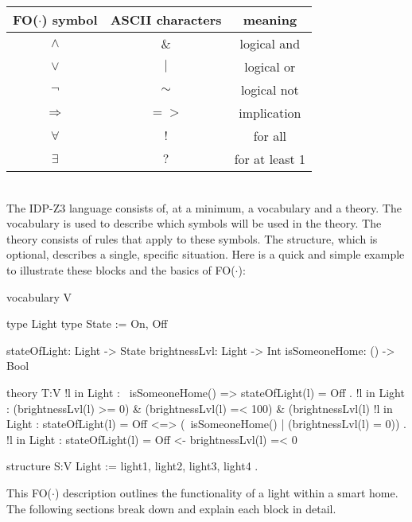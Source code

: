 \documentclass[11pt,a4paper]{report}
\newcommand{\fodot}{FO($\cdot$)\xspace}
\begin{document}
\begin{tabular}{|c|c|c|}
\hline
\fodot symbol & ASCII characters & meaning \\ \hline
$\land$  & $\&$ & logical and   \\ \hline
$\lor$   & $\mid$ & logical or   \\ \hline
$\neg$   & $\sim$ & logical not   \\ \hline
$\Rightarrow$ & $=>$ & implication   \\ \hline
$\forall$ & $!$ & for all   \\ \hline
$\exists$   & $?$ & for at least 1   \\ \hline
\end{tabular}
\\

The IDP-Z3 language consists of, at a minimum, a vocabulary and a theory. The vocabulary is used to describe which symbols will be used in the theory. The theory consists of rules that apply to these symbols. The structure, which is optional, describes a single, specific situation. Here is a quick and simple example to illustrate these blocks and the basics of \fodot:

\begin{idplisting}
vocabulary V {
    type Light
    type State := {On, Off}
    
    stateOfLight: Light -> State
    brightnessLvl: Light -> Int
    isSomeoneHome: () -> Bool
}

theory T:V {
    !l in Light : ~isSomeoneHome() => stateOfLight(l) = Off .
    !l in Light : (brightnessLvl(l) >= 0) & (brightnessLvl(l) =< 100) & (brightnessLvl(l) %
    !l in Light : stateOfLight(l) = Off <=> (~isSomeoneHome() | (brightnessLvl(l) = 0)) .
    {
       !l in Light : stateOfLight(l) = Off <- brightnessLvl(l) =< 0
    }
}

structure S:V {
    Light := {light1, light2, light3, light4} .
}

\end{idplisting}
This \fodot description outlines the functionality of a light within a smart home. The following sections break down and explain each block in detail.
\end{document}
